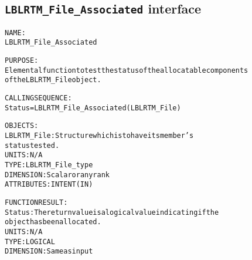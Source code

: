 \subsection{\texttt{LBLRTM\_File\_Associated} interface}
  \label{sec:LBLRTM_File_Associated_interface}
  \begin{alltt}
 
  NAME:
        LBLRTM_File_Associated
 
  PURPOSE:
        Elemental function to test the status of the allocatable components
        of the LBLRTM_File object.
 
  CALLING SEQUENCE:
        Status = LBLRTM_File_Associated( LBLRTM_File )
 
  OBJECTS:
        LBLRTM_File:   Structure which is to have its member's
                       status tested.
                       UNITS:      N/A
                       TYPE:       LBLRTM_File_type
                       DIMENSION:  Scalar or any rank
                       ATTRIBUTES: INTENT(IN)
 
  FUNCTION RESULT:
        Status:        The return value is a logical value indicating if the
                       object has been allocated.
                       UNITS:      N/A
                       TYPE:       LOGICAL
                       DIMENSION:  Same as input
 
  \end{alltt}
